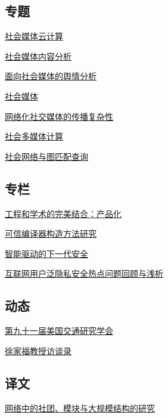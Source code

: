 \documentclass[a4paper]{article}
\begin{document}
\subsection{专题}
\href{http://history.ccf.org.cn/resources/1190201776262/2012/04/16/7.pdf}{社会媒体云计算}

\href{http://history.ccf.org.cn/resources/1190201776262/2012/04/16/3.pdf}{社会媒体内容分析}

\href{http://history.ccf.org.cn/resources/1190201776262/2012/04/16/6.pdf}{面向社会媒体的舆情分析}

\href{http://history.ccf.org.cn/resources/1190201776262/2012/04/16/1.pdf}{社会媒体}

\href{http://history.ccf.org.cn/resources/1190201776262/2012/04/16/5.pdf}{网络化社交媒体的传播复杂性}

\href{http://history.ccf.org.cn/resources/1190201776262/2012/04/16/2.pdf}{社会多媒体计算}

\href{http://history.ccf.org.cn/resources/1190201776262/2012/04/16/4.pdf}{社会网络与图匹配查询}

\subsection{专栏}
\href{http://history.ccf.org.cn/resources/1190201776262/2012/04/16/9.pdf}{工程和学术的完美结合：产品化}

\href{http://history.ccf.org.cn/resources/1190201776262/2012/04/16/11.pdf}{可信编译器构造方法研究}

\href{http://history.ccf.org.cn/resources/1190201776262/2012/04/16/8.pdf}{智能驱动的下一代安全}

\href{http://history.ccf.org.cn/resources/1190201776262/2012/04/16/10.pdf}{互联网用户泛隐私安全热点问题回顾与浅析}

\subsection{动态}
\href{http://history.ccf.org.cn/resources/1190201776262/2012/04/16/13.pdf}{第九十一届美国交通研究学会}

\href{http://history.ccf.org.cn/resources/1190201776262/2012/04/16/12.pdf}{徐家福教授访谈录}

\subsection{译文}
\href{http://history.ccf.org.cn/resources/1190201776262/2012/04/16/14.pdf}{网络中的社团、模块与大规模结构的研究}
\end{document}
